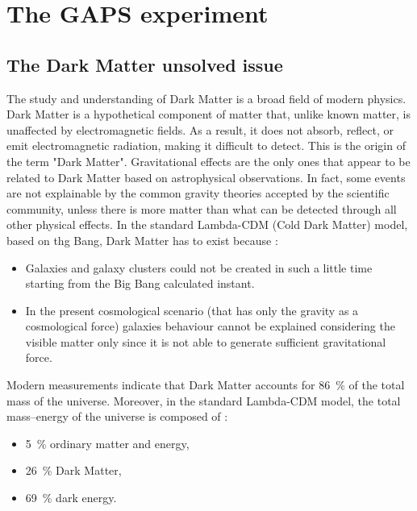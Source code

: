 \chapter{The GAPS experiment} \label{appendixGAPSintro}


\section{The Dark Matter unsolved issue}
The study and understanding of Dark Matter is a broad field of modern physics. Dark Matter is a hypothetical component of matter that, unlike known matter, is unaffected by electromagnetic fields. As a result, it does not absorb, reflect, or emit electromagnetic radiation, making it difficult to detect. This is the origin of the term "Dark Matter". Gravitational effects are the only ones that appear to be related to Dark Matter based on astrophysical observations. In fact, some events are not explainable by the common gravity theories accepted by the scientific community, unless there is more matter than what can be detected through all other physical effects. In the standard Lambda-CDM (Cold Dark Matter) model, based on thg Bang, Dark Matter has to exist because \cite{aramaki_2016_review}:

\begin{itemize}
    \itemsep0em
    \item Galaxies and galaxy clusters could not be created in such a little time starting from the Big Bang calculated instant.
    \item In the present cosmological scenario (that has only the gravity as a cosmological force) galaxies behaviour cannot be explained considering the visible matter only since it is not able to generate sufficient gravitational force.
\end{itemize}

Modern measurements indicate that Dark Matter accounts for \SI{86}{\percent} of the total mass of the universe. Moreover, in the standard Lambda-CDM model, the total mass–energy of the universe is composed of \cite{feng_2010_dark}:

\begin{itemize}
    \itemsep0em
    \item \SI{5}{\percent} ordinary matter and energy,
    \item \SI{26}{\percent} Dark Matter,
    \item \SI{69}{\percent} dark energy.
\end{itemize}

